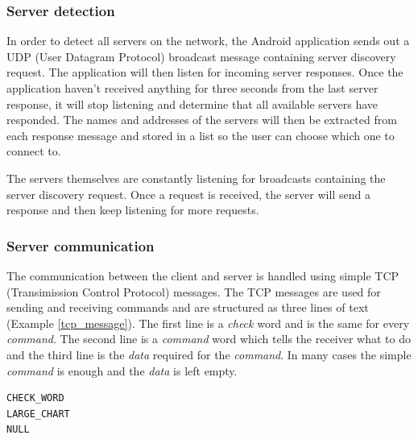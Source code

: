 \documentclass[12pt,a4paper,notitlepage]{report}
\begin{document}
\subsubsection{Server detection}
In order to detect all servers on the network, the Android application sends out a UDP (User Datagram Protocol) broadcast message containing server discovery request. The application will then listen for incoming server responses. Once the application haven't received anything for three seconds from the last server response, it will stop listening and determine that all available servers have responded. The names and addresses of the servers will then be extracted from each response message and stored in a list so the user can choose which one to connect to.

The servers themselves are constantly listening for broadcasts containing the server discovery request. Once a request is received, the server will send a response and then keep listening for more requests.

\subsubsection{Server communication}
The communication between the client and server is handled using simple TCP (Transimission Control Protocol) messages. The TCP messages are used for sending and receiving commands and are structured as three lines of text (Example \ref{tcp_message}). The first line is a \textit{check} word and is the same for every \textit{command}. The second line is a \textit{command} word which tells the receiver what to do and the third line is the \textit{data} required for the \textit{command}. In many cases the simple \textit{command} is enough and the \textit{data} is left empty.

\begin{center}
\renewcommand{\lstlistingname}{Example}
  \lstset{%
    title=Example of TCP message,
    basicstyle=\ttfamily\footnotesize\bfseries,
    xleftmargin=.2\textwidth, xrightmargin=.2\textwidth
  }
\begin{lstlisting}[caption=TCP Message, label=tcp_message]
CHECK_WORD
LARGE_CHART
NULL
\end{lstlisting}
\end{center}





\end{document}
